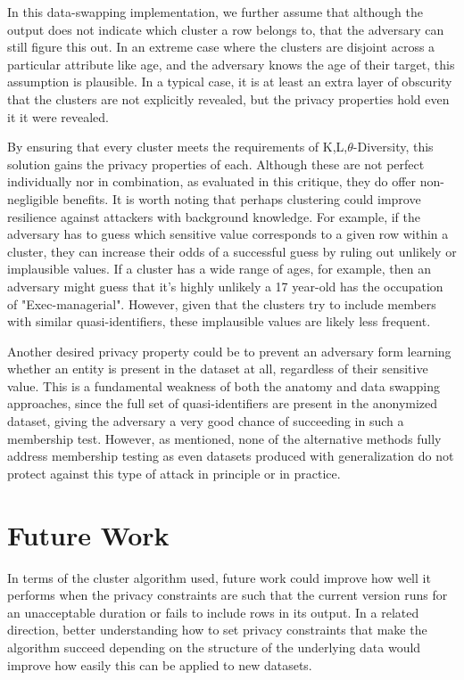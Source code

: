 In this data-swapping implementation, we further assume that although the output does not indicate which cluster a row belongs to, that the adversary can still figure this out. In an extreme case where the clusters are disjoint across a particular attribute like age, and the adversary knows the age of their target, this assumption is plausible. In a typical case, it is at least an extra layer of obscurity that the clusters are not explicitly revealed, but the privacy properties hold even it it were revealed.

By ensuring that every cluster meets the requirements of K,L,$\theta$-Diversity, this solution gains the privacy properties of each. Although these are not perfect individually nor in combination, as evaluated in this critique\cite{domingoCritique}, they do offer non-negligible benefits. It is worth noting that perhaps clustering could improve resilience against attackers with background knowledge. For example, if the adversary has to guess which sensitive value corresponds to a given row within a cluster, they can increase their odds of a successful guess by ruling out unlikely or implausible values. If a cluster has a wide range of ages, for example, then an adversary might guess that it's highly unlikely a 17 year-old has the occupation of "Exec-managerial". However, given that the clusters try to include members with similar quasi-identifiers, these implausible values are likely less frequent.

Another desired privacy property could be to prevent an adversary form learning whether an entity is present in the dataset at all, regardless of their sensitive value. This is a fundamental weakness of both the anatomy and data swapping approaches, since the full set of quasi-identifiers are present in the anonymized dataset, giving the adversary a very good chance of succeeding in such a membership test. However, as mentioned, none of the alternative methods fully address membership testing as even datasets produced with generalization do not protect against this type of attack in principle or in practice.

\section{Future Work}
In terms of the cluster algorithm used, future work could improve how well it performs when the privacy constraints are such that the current version runs for an unacceptable duration or fails to include rows in its output. In a related direction, better understanding how to set privacy constraints that make the algorithm succeed depending on the structure of the underlying data would improve how easily this can be applied to new datasets.

